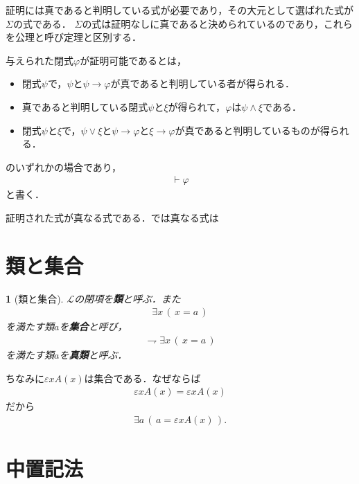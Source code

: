 \documentclass[a4j,10.5pt,oneside,openany]{jsbook}
\theoremstyle{mystyle}
\newtheorem{dfn}[thm]{\color{PakistanGreen}{定義}}
\begin{document}
	証明には真であると判明している式が必要であり，その大元として選ばれた式が$\Sigma$の式である．
	$\Sigma$の式は証明なしに真であると決められているのであり，これらを公理と呼び定理と区別する．
	
	与えられた閉式$\varphi$が証明可能であるとは，
	\begin{itemize}
		\item 閉式$\psi$で，$\psi$と$\psi \rightarrow \varphi$が真であると判明している者が得られる．
		\item 真であると判明している閉式$\psi$と$\xi$が得られて，$\varphi$は$\psi \wedge \xi$である．
		\item 閉式$\psi$と$\xi$で，$\psi \vee \xi$と$\psi \rightarrow \varphi$と$\xi \rightarrow \varphi$が真であると判明しているものが得られる．
	\end{itemize}
	
	のいずれかの場合であり，
	\begin{align}
		\vdash \varphi
	\end{align}
	と書く．
	
	証明された式が真なる式である．では真なる式は

\section{類と集合}
	\begin{screen}
		\begin{dfn}[類と集合]
			$\mathcal{L}$の閉項を{\bf 類}と呼ぶ．また
			\begin{align}
				\exists x\, (\, x = a\, )
			\end{align}
			を満たす類$a$を{\bf 集合}と呼び，
			\begin{align}
				\rightharpoondown \exists x\, (\, x = a\, )
			\end{align}
			を満たす類$a$を{\bf 真類}と呼ぶ．
		\end{dfn}
	\end{screen}
	
	ちなみに$\varepsilon x A(x)$は集合である．なぜならば
	\begin{align}
		\varepsilon x A(x) = \varepsilon x A(x)
	\end{align}
	だから
	\begin{align}
		\exists a\, \left(\, a = \varepsilon x A(x)\, \right).
	\end{align}
	
\section{中置記法}
	
\end{document}
